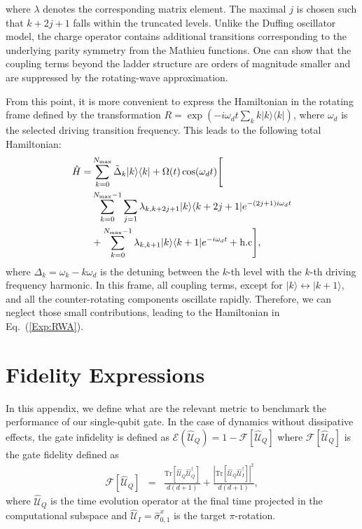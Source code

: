 \documentclass[superscriptaddress,amsmath,amssymb,aps,twocolumn,praplied,notitlepage]{revtex4-2}
\newcommand{\ket}[1]{\vert #1 \rangle}
\newcommand{\bra}[1]{\langle #1 \vert}
\newcommand{\ketbra}[2]{\vert #1 \rangle \langle #2 \vert}
\newcommand{\Tr}{\mathrm{Tr}}
\begin{document}
where $\lambda$ denotes the corresponding matrix element.
The maximal $j$ is chosen such that $k+2j+1$ falls within the truncated levels. Unlike the Duffing oscillator model, the charge operator contains additional transitions corresponding to the underlying parity symmetry from the Mathieu functions. One can show that the coupling terms beyond the ladder structure are orders of magnitude smaller and are suppressed by the rotating-wave approximation.

From this point, it is more convenient to express the Hamiltonian in the rotating frame defined by the transformation $R = \exp\left(-i\omega_d t\sum_{k}k\ketbra{k}{k}\right)$, where $\omega_d$ is the selected driving transition frequency. This leads to the following total Hamiltonian:
\begin{align}
\label{HT}
    \hat{H}=&\sum_{k=0}^{N_{{\rm{max}}}}\tilde{\Delta}_{k}\ket{k}\bra{k}+\Omega(t)\cos(\omega_d t)
    \Biggr[\nonumber\\
    &\sum_{k=0}^{N_{\rm{max}}-1}\sum_{j=1}\lambda_{k,k+2j+1}\ketbra{k}{k+2j+1}e^{-(2j+1)i\omega_d t}
    \nonumber\\
    &+
    \sum_{k=0}^{N_{{\rm{max}}}-1}\lambda_{k,k+1}\ketbra{k}{k+1}e^{-i\omega_d t}
    +\rm{h.c}
    \Biggr]
    ,
\end{align}
where $\Delta_{k}=\omega_{k}-k\omega_{d}$ is the detuning between the $k$-th level with the $k$-th driving frequency harmonic. In this frame, all coupling terms, except for $\ket{k}\leftrightarrow\ket{k+1}$, and all the counter-rotating components oscillate rapidly. Therefore, we can neglect those small contributions, leading to the Hamiltonian in Eq.~(\ref{Exp:RWA}).




\section{Fidelity Expressions}\label{Fid_metric}
In this appendix, we define what are the relevant metric to benchmark the performance of our single-qubit gate. In the case of dynamics without dissipative effects, the gate infidelity is defined as $\mathcal{E}(\hat{\mathcal{U}}_Q)=1-\mathcal{F} [\hat{\mathcal{U}}_Q]$ where $\mathcal{F} [\hat{\mathcal{U}}_Q]$ is the gate fidelity defined as
\begin{eqnarray}
\mathcal{F}[\hat{\mathcal{U}}_Q]&=&\frac{\Tr [\hat{\mathcal{U}}_Q \hat{\mathcal{U}}^{\dagger}_Q]}{d(d+1)}
    + \frac{ \left|\Tr [\hat{\mathcal{U}}_Q \hat{\mathcal{U}}_I^{\dagger}] \right|^2}{d(d+1)},
\end{eqnarray}
where $\hat{\mathcal{U}}_Q$ is the time evolution operator at the final time projected in the computational subspace and $\hat{\mathcal{U}}_I=\hat{\sigma}_{0,1}^{x}$ is the target $\pi$-rotation.
\end{document}
